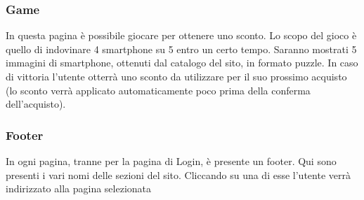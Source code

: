 \documentclass[12pt]{extarticle}
\begin{document}
\subsubsection{Game}
In questa pagina è possibile giocare per ottenere uno sconto. Lo scopo del gioco è quello di
indovinare 4 smartphone su 5 entro un certo tempo. Saranno mostrati 5 immagini di smartphone,
ottenuti dal catalogo del sito, in formato puzzle. In caso di vittoria l'utente otterrà uno sconto da 
utilizzare per il suo prossimo acquisto (lo sconto verrà applicato automaticamente poco prima
della conferma dell'acquisto).


\subsubsection{Footer}
In ogni pagina, tranne per la pagina di Login, è presente un footer. Qui sono presenti i vari nomi
delle sezioni del sito. Cliccando su una di esse l'utente verrà indirizzato alla pagina selezionata
\end{document}
